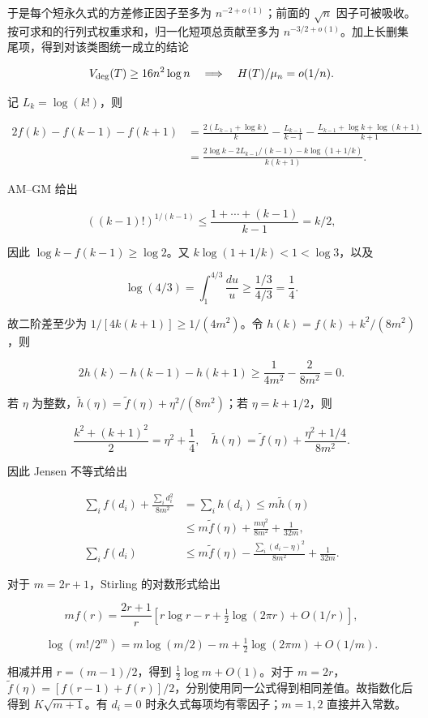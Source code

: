 \documentclass[11pt,a4paper]{article}
\begin{document}
于是每个短永久式的方差修正因子至多为 \(n^{-2+o(1)}\)；前面的 \(\sqrt n\) 因子可被吸收。按可求和的行列式权重求和，归一化短项总贡献至多为 \(n^{-3/2+o(1)}\)。加上长删集尾项，得到对该类图统一成立的结论

\[
V_{\rm deg}(T)\ge16n^2\log n\quad\Longrightarrow\quad
H(T)/\mu_n=o(1/n).
\]

记 \(L_k=\log(k!)\)，则

\[
\begin{aligned}
2f(k)-f(k-1)-f(k+1)
&=\frac{2(L_{k-1}+\log k)}k-\frac{L_{k-1}}{k-1}
-\frac{L_{k-1}+\log k+\log(k+1)}{k+1}\\
&=\frac{2\log k-2L_{k-1}/(k-1)-k\log(1+1/k)}{k(k+1)}.
\end{aligned}
\]

AM--GM 给出

\[
((k-1)!)^{1/(k-1)}\le\frac{1+\cdots+(k-1)}{k-1}=k/2,
\]

因此 \(\log k-f(k-1)\ge\log2\)。又 \(k\log(1+1/k)<1<\log3\)，以及

\[
\log(4/3)=\int_1^{4/3}\frac{du}{u}\ge\frac{1/3}{4/3}=\frac14.
\]

故二阶差至少为 \(1/[4k(k+1)]\ge1/(4m^2)\)。令 \(h(k)=f(k)+k^2/(8m^2)\)，则

\[
2h(k)-h(k-1)-h(k+1)
\ge\frac1{4m^2}-\frac2{8m^2}=0.
\]

若 \(\eta\) 为整数，\(\widetilde h(\eta)=\widetilde f(\eta)+\eta^2/(8m^2)\)；若 \(\eta=k+1/2\)，则

\[
\frac{k^2+(k+1)^2}{2}=\eta^2+\frac14,
\quad
\widetilde h(\eta)=\widetilde f(\eta)+\frac{\eta^2+1/4}{8m^2}.
\]

因此 Jensen 不等式给出

\[
\begin{aligned}
\sum_i f(d_i)+\frac{\sum_i d_i^2}{8m^2}
&=\sum_i h(d_i)\le m\widetilde h(\eta)\\
&\le m\widetilde f(\eta)+\frac{m\eta^2}{8m^2}+\frac1{32m},\\
\sum_i f(d_i)&\le m\widetilde f(\eta)
-\frac{\sum_i(d_i-\eta)^2}{8m^2}+\frac1{32m}.
\end{aligned}
\]

对于 \(m=2r+1\)，Stirling 的对数形式给出

\[
m f(r)=\frac{2r+1}{r}\left[r\log r-r+\tfrac12\log(2\pi r)+O(1/r)\right],
\]

\[
\log(m!/2^m)=m\log(m/2)-m+\tfrac12\log(2\pi m)+O(1/m).
\]

相减并用 \(r=(m-1)/2\)，得到 \(\tfrac12\log m+O(1)\)。对于 \(m=2r\)， \(\widetilde f(\eta)=[f(r-1)+f(r)]/2\)，分别使用同一公式得到相同差值。故指数化后得到 \(K\sqrt{m+1}\)。有 \(d_i=0\) 时永久式每项均有零因子；\(m=1,2\) 直接并入常数。
\end{document}

